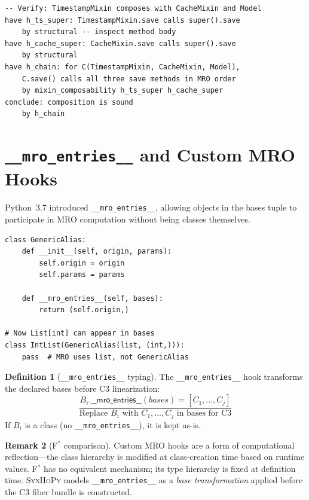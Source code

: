 \documentclass[11pt,a4paper]{report}
\theoremstyle{definition}
\newtheorem{definition}{Definition}[chapter]
\newtheorem{remark}[definition]{Remark}
\theoremstyle{plain}
\newcommand{\fstar}{F$^{*}$}
\newcommand{\synhopy}{\textsc{SynHoPy}}
\begin{document}
\begin{lstlisting}[style=proof]
-- Verify: TimestampMixin composes with CacheMixin and Model
have h_ts_super: TimestampMixin.save calls super().save
    by structural -- inspect method body
have h_cache_super: CacheMixin.save calls super().save
    by structural
have h_chain: for C(TimestampMixin, CacheMixin, Model),
    C.save() calls all three save methods in MRO order
    by mixin_composability h_ts_super h_cache_super
conclude: composition is sound
    by h_chain
\end{lstlisting}

\section{\texttt{\_\_mro\_entries\_\_} and Custom MRO Hooks}

Python~3.7 introduced \lstinline[style=python]{__mro_entries__}, allowing
objects in the bases tuple to participate in MRO computation without being
classes themselves.

\begin{lstlisting}[style=python]
class GenericAlias:
    def __init__(self, origin, params):
        self.origin = origin
        self.params = params

    def __mro_entries__(self, bases):
        return (self.origin,)

# Now List[int] can appear in bases
class IntList(GenericAlias(list, (int,))):
    pass  # MRO uses list, not GenericAlias
\end{lstlisting}

\begin{definition}[\texttt{\_\_mro\_entries\_\_} typing]
\label{def:mro-entries}
The \lstinline[style=python]{__mro_entries__} hook transforms the declared
bases before C3 linearization:
\[
  \frac{
    B_i.\mathsf{\_\_mro\_entries\_\_}(\mathit{bases}) = [C_1, \ldots, C_j]
  }{
    \text{Replace } B_i \text{ with } C_1, \ldots, C_j \text{ in bases for C3}
  }
\]
If $B_i$ is a class (no \lstinline[style=python]{__mro_entries__}), it is
kept as-is.
\end{definition}

\begin{remark}[\fstar{} comparison]
Custom MRO hooks are a form of computational reflection---the class hierarchy
is modified at class-creation time based on runtime values.  \fstar{} has
no equivalent mechanism; its type hierarchy is fixed at definition time.
\synhopy{} models \lstinline[style=python]{__mro_entries__} as a
\emph{base transformation} applied before the C3 fiber bundle is constructed.
\end{remark}
\end{document}
